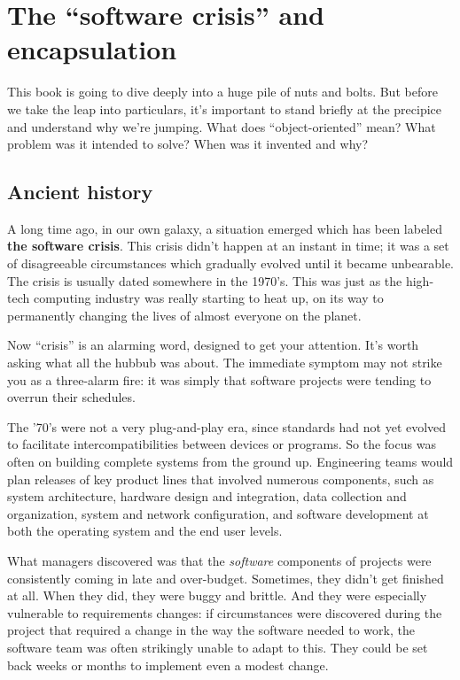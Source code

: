 
\chapter{The ``software crisis'' and encapsulation}
\label{ch:encapsulation}

This book is going to dive deeply into a huge pile of nuts and bolts. But
before we take the leap into particulars, it's important to stand briefly at
the precipice and understand why we're jumping. What does ``object-oriented''
mean? What problem was it intended to solve? When was it invented and why?

\section{Ancient history}

A long time ago, in our own galaxy, a situation emerged which has been labeled
\textbf{the software crisis}. This crisis didn't happen at an instant in time;
it was a set of disagreeable circumstances which gradually evolved until it
became unbearable. The crisis is usually dated somewhere in the 1970's. This
was just as the high-tech computing industry was really starting to heat up,
on its way to permanently changing the lives of almost everyone on the planet.

Now ``crisis'' is an alarming word, designed to get your attention. It's worth
asking what all the hubbub was about. The immediate symptom may not strike you
as a three-alarm fire: it was simply that software projects were tending to
overrun their schedules.

The '70's were not a very plug-and-play era, since standards had not yet
evolved to facilitate intercompatibilities between devices or programs. So the
focus was often on building complete systems from the ground up. Engineering
teams would plan releases of key product lines that involved numerous
components, such as system architecture, hardware design and integration, data
collection and organization, system and network configuration, and software
development at both the operating system and the end user levels.

What managers discovered was that the \textit{software} components of projects
were consistently coming in late and over-budget. Sometimes, they didn't get
finished at all. When they did, they were buggy and brittle. And they were
especially vulnerable to requirements changes: if circumstances were
discovered during the project that required a change in the way the software
needed to work, the software team was often strikingly unable to adapt to
this. They could be set back weeks or months to implement even a modest
change.

